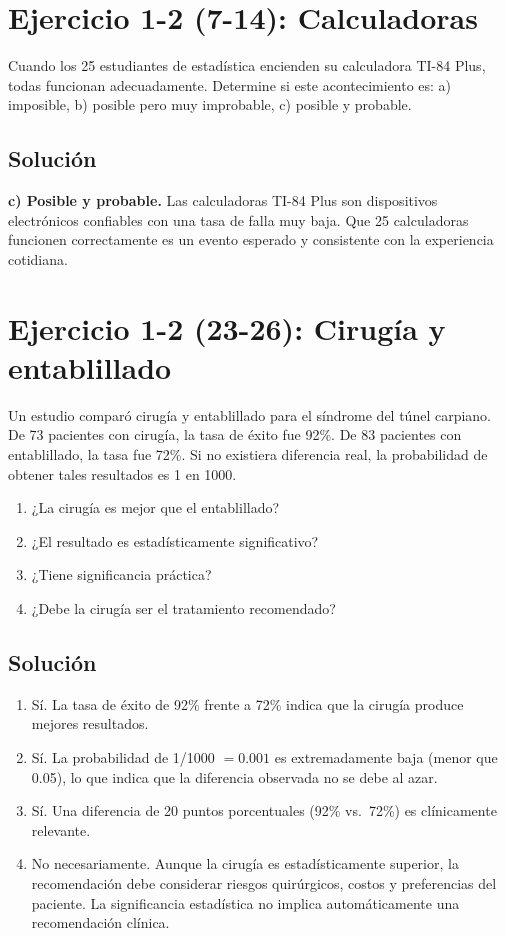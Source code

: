 \documentclass[a4paper]{article}
\begin{document}
\tableofcontents

\section{Ejercicio 1-2 (7-14): Calculadoras}

Cuando los 25 estudiantes de estadística encienden su calculadora TI-84 Plus, todas funcionan adecuadamente. Determine si este acontecimiento es: a) imposible, b) posible pero muy improbable, c) posible y probable.

\subsection{Solución}

\textbf{c) Posible y probable.} Las calculadoras TI-84 Plus son dispositivos electrónicos confiables con una tasa de falla muy baja. Que 25 calculadoras funcionen correctamente es un evento esperado y consistente con la experiencia cotidiana.

\section{Ejercicio 1-2 (23-26): Cirugía y entablillado}

Un estudio comparó cirugía y entablillado para el síndrome del túnel carpiano. De 73 pacientes con cirugía, la tasa de éxito fue 92\%. De 83 pacientes con entablillado, la tasa fue 72\%. Si no existiera diferencia real, la probabilidad de obtener tales resultados es 1 en 1000.

\begin{enumerate}
    \item[a)] ¿La cirugía es mejor que el entablillado?
    \item[b)] ¿El resultado es estadísticamente significativo?
    \item[c)] ¿Tiene significancia práctica?
    \item[d)] ¿Debe la cirugía ser el tratamiento recomendado?
\end{enumerate}

\subsection{Solución}

\begin{enumerate}
    \item[a)] Sí. La tasa de éxito de 92\% frente a 72\% indica que la cirugía produce mejores resultados.
    \item[b)] Sí. La probabilidad de 1/1000 $= 0.001$ es extremadamente baja (menor que 0.05), lo que indica que la diferencia observada no se debe al azar.
    \item[c)] Sí. Una diferencia de 20 puntos porcentuales (92\% vs.~72\%) es clínicamente relevante.
    \item[d)] No necesariamente. Aunque la cirugía es estadísticamente superior, la recomendación debe considerar riesgos quirúrgicos, costos y preferencias del paciente. La significancia estadística no implica automáticamente una recomendación clínica.
\end{enumerate}
\end{document}
